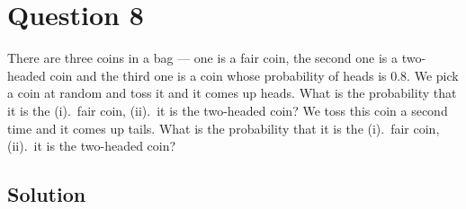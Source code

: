 \section*{Question 8}

There are three coins in a bag --- one is a fair coin, the second one is a two-headed coin and the third one is a coin whose probability of heads is 0.8.
We pick a coin at random and toss it and it comes up heads.
What is the probability that it is the (i).\ fair coin, (ii).\ it is the two-headed coin?
We toss this coin a second time and it comes up tails.
What is the probability that it is the (i).\ fair coin, (ii).\ it is the two-headed coin?

\subsection*{Solution}
